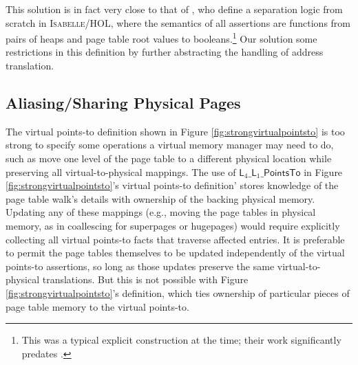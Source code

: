 This solution is in fact very close to that of \citet{kolanski08vstte}, who define a separation logic from scratch in \textsc{Isabelle/HOL},
where the semantics of all assertions are functions from pairs of heaps and page table root values to booleans.\footnote{
  This was a typical explicit construction at the time; their work significantly predates \iris.
}
Our solution  some restrictions in this definition by further abstracting the handling of address translation.

\subsection{Aliasing/Sharing Physical Pages}
  \label{sec:sharingpages}  
  The virtual points-to definition shown in Figure \ref{fig:strongvirtualpointsto} 
  is too strong to specify some operations a virtual memory manager may need to do, such as
  move one level of the page table to a different physical location while preserving all virtual-to-physical mappings. %
  The use of $\textsf{L}_{4}\_\textsf{L}_{1}\_\textsf{PointsTo}$ in Figure \ref{fig:strongvirtualpointsto}'s
  virtual points-to definition'
   stores knowledge of the page table walk's details with ownership of the backing physical
  memory.
  Updating any of these mappings (e.g., moving the page tables in physical memory, as in coallescing for
  superpages or hugepages)
  would require explicitly collecting all virtual points-to facts that traverse affected entries.
  It is preferable to permit the page tables themselves to be updated independently of the virtual points-to assertions,
  so long as those updates preserve the same virtual-to-physical translations.
  But this is not possible with Figure \ref{fig:strongvirtualpointsto}'s definition, which ties ownership of particular
  pieces of page table memory to the virtual points-to.


  \newcommand{\ghostmaptoken}[3]{\ensuremath{#2\hookrightarrow^{#1}#3}}
  \newcommand{\fracghostmaptoken}[4]{\ensuremath{#2\hookrightarrow^{#1}_{#4}#3}}

